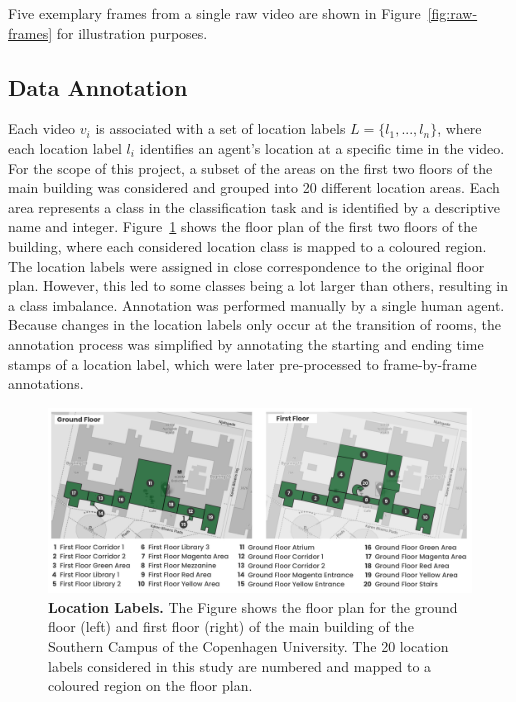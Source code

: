 \documentclass[a4paper]{article}
\begin{document}
Five exemplary frames from a single raw video are shown in
Figure~\ref{fig:raw-frames} for illustration purposes.

\subsection{Data Annotation} %
\label{sub:data-annotation}

Each video $v_i$ is associated with a set of location labels $L = \{l_1, ...,
l_n\}$, where each location label $l_i$ identifies an agent's location at a
specific time in the video. For the scope of this project, a subset of the areas
on the first two floors of the main building was considered and grouped into 20
different location areas. Each area represents a class in the classification
task and is identified by a descriptive name and integer.
Figure~\ref{fig:location-labels} shows the floor plan of the first two floors of
the building, where each considered location class is mapped to a coloured
region. The location labels were assigned in close correspondence to the
original floor plan. However, this led to some classes being a lot larger than
others, resulting in a class imbalance. Annotation was performed manually by a
single human agent. Because changes in the location labels only occur at the
transition of rooms, the annotation process was simplified by annotating the
starting and ending time stamps of a location label, which were later
pre-processed to frame-by-frame annotations.

\begin{figure}
\centering
\includegraphics[width=\textwidth]{figures/location-labels.png}
\caption{
  \textbf{Location Labels.} The Figure shows the floor plan for the ground floor
  (left) and first floor (right) of the main building of the Southern Campus of
  the Copenhagen University. The 20 location labels considered in this study are
  numbered and mapped to a coloured region on the floor plan.}

\label{fig:location-labels}
\end{figure}
\end{document}

